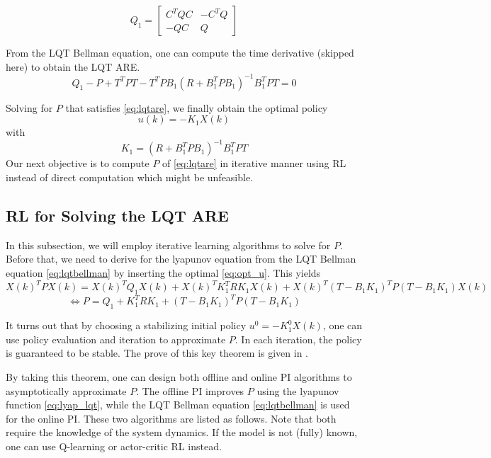 \begin{equation}
Q_1 = \left[ \begin{array}{cc}
C^TQC & -C^TQ \\ 
-QC & Q
\end{array} \right] 
\end{equation}

From the LQT Bellman equation, one can compute the time derivative (skipped here) to obtain the LQT ARE.
\begin{equation}
\label{eq:lqtare}
Q_1 - P + T^TPT - T^TPB_1(R+B_1^TPB_1)^{-1}B_1^TPT = 0
\end{equation}

Solving for $P$ that satisfies \eqref{eq:lqtare}, we finally obtain the optimal policy 
\begin{equation}
\label{eq:opt_u}
u(k) = -K_1X(k)
\end{equation}
with
\begin{equation}
K_1 = (R+B_1^TPB_1)^{-1}B_1^TPT
\end{equation}
Our next objective is to compute $P$ of \eqref{eq:lqtare} in iterative manner using \ac {RL} instead of direct computation which might be unfeasible. 

\subsection{\ac{RL} for Solving the LQT ARE}
In this subsection, we will employ iterative learning algorithms to solve for $P$. Before that, we need to derive for the lyapunov equation from the LQT Bellman equation \eqref{eq:lqtbellman} by inserting the optimal \eqref{eq:opt_u}. This yields
\begin{equation*}
X(k)^TPX(k) =  X(k)^TQ_1X(k) + X(k)^TK_1^TRK_1X(k) + X(k)^T(T - B_1K_1)^TP(T - B_1K_1)X(k)
\end{equation*}
\begin{equation}
\label{eq:lyap_lqt}
\Leftrightarrow  P =  Q_1 + K_1^TRK_1 + (T - B_1K_1)^TP(T - B_1K_1)
\end{equation}

It turns out that by choosing a stabilizing initial policy $u^0 = -K_1^0X(k)$, one can use policy evaluation and iteration to approximate $ P $. In each iteration, the policy is guaranteed to be stable. The prove of this key theorem is given in \cite{1099755}. 

By taking this theorem, one can design both offline and online \ac{PI} algorithms to asymptotically approximate $P$. The offline \ac{PI} improves $P$ using the lyapunov function \eqref{eq:lyap_lqt}, while the LQT Bellman equation \eqref{eq:lqtbellman} is used for the online \ac{PI}. These two algorithms are listed as follows. Note that both require the knowledge of the system dynamics. If the model is not (fully) known, one can use Q-learning \cite{Kiumarsi20141167} or actor-critic \ac {RL} \cite{Modares20141780} instead. 

